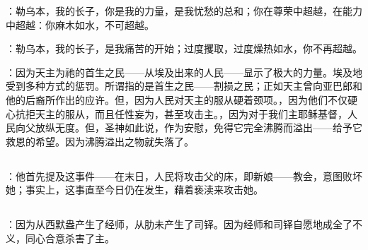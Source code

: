 ：勒乌本，我的长子，你是我的力量，是我忧愁的总和；你在尊荣中超越，在能力中超越：你麻木如水，不可超越。\par

：勒乌本，我的长子，是我痛苦的开始；过度攫取，过度燥热如水，你不再超越。\par

：因为天主为祂的首生之民——从埃及出来的人民——显示了极大的力量。埃及地受到多种方式的惩罚。所谓指的是首生之民——割损之民；正如天主曾向亚巴郎和他的后裔所作出的应许。但，因为人民对天主的服从硬着颈项。，因为他们不仅硬心抗拒天主的服从，而且任性妄为，甚至攻击主。，因为对于我们主耶稣基督，人民向父放纵无度。但，圣神如此说，作为安慰，免得它完全沸腾而溢出——给予它救恩的希望。因为沸腾溢出之物就失落了。\par


\subsection{}

\par

：他首先提及这事件——在末日，人民将攻击父的床，即新娘——教会，意图败坏她；事实上，这事直至今日仍在发生，藉着亵渎来攻击她。\par


\subsection{}

\par

：因为从西默盎产生了经师，从肋未产生了司铎。因为经师和司铎自愿地成全了不义，同心合意杀害了主。\par


\subsection{}


